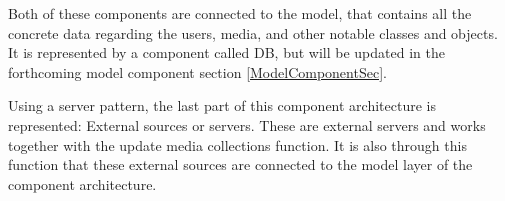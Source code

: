 Both of these components are connected to the model, that contains all the concrete data regarding the users, media, and other notable classes and objects. It is represented by a component called DB, but will be updated in the forthcoming model component section \ref{ModelComponentSec}.

Using a server pattern, the last part of this component architecture is represented: External sources or servers. These are external servers and works together with the update media collections function. It is also through this function that these external sources are connected to the model layer of the component architecture.